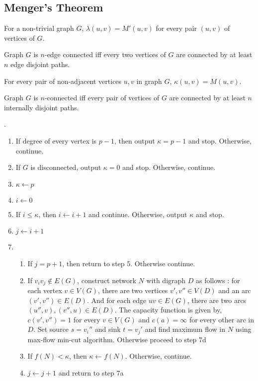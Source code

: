 \subsection{Menger's Theorem}
\begin{theorem}
	For a non-trivial graph $G$, $\lambda(u,v) = M'(u,v)$ for every pair $(u,v)$ of vertices of $G$.
\end{theorem}
\begin{corollary}
	Graph $G$ is $n$-edge connected iff every two vertices of $G$ are connected by at least $n$ edge disjoint paths.
\end{corollary}

\begin{theorem}
	For every pair of non-adjacent vertices $u,v$ in graph $G$, $\kappa(u,v) = M(u,v)$.
\end{theorem}
\begin{corollary}
	Graph $G$ is $n$-connected iff every pair of vertices of $G$ are connected by at least $n$ internally disjoint paths.
\end{corollary}

\begin{algorithm}.
	\begin{enumerate}
		\item If degree of every vertex is $p-1$, then output $\kappa = p-1$ and stop.
			Otherwise, continue.
		\item If $G$ is disconnected, output $\kappa = 0$ and stop.
			Otherwise, continue.
		\item $\kappa \leftarrow p$
		\item $i \leftarrow 0$
		\item If $i \le \kappa$, then $i \leftarrow i+1$ and continue.
			Otherwise, output $\kappa$ and stop.
		\item $j \leftarrow i+1$
		\item 
			\begin{enumerate}[label=(\arabic*)]
				\item If $j = p+1$, then return to step 5.
					Otherwise continue.
				\item If $v_iv_j \not\in E(G)$, construct network $N$ with digraph $D$ as follows : for each vertex $ v \in V(G)$, there are two vertices $v',v'' \in V(D)$ and an arc $(v',v'') \in E(D)$.
					And for each edge $uv \in E(G)$, there are two arcs $(u'',v),(v'',u) \in E(D)$.
					The capacity function is given by, $c(v',v'') = 1$ for every $v \in V(G)$ and $c(a) = \infty$ for every other arc in $D$.
					Set source $s = v_i''$ and sink $t = v_j'$ and find maximum flow in $N$ using max-flow min-cut algorithm.
					Otherwise proceed to step 7d
				\item If $f(N) < \kappa$, then $\kappa \leftarrow f(N)$.
					Otherwise, continue.
				\item $j \leftarrow j+1$ and return to step 7a
			\end{enumerate}
	\end{enumerate}
\end{algorithm}

